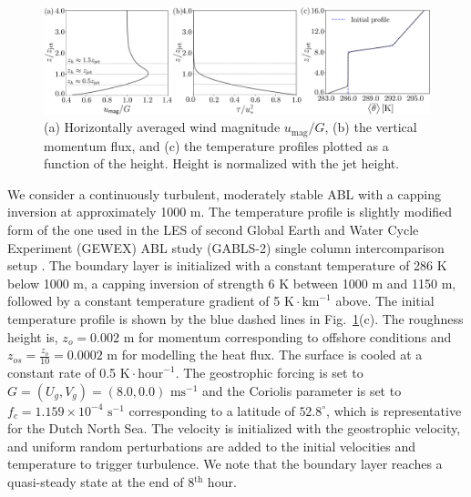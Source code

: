 \documentclass[%
 aip,
 amsmath,amssymb,
reprint,
twocolumn,%
author-numerical,%
]{revtex4-1}
\begin{document}
\begin{figure}
 \centering
 \includegraphics[width=\linewidth]{fig2}
 \caption{(a) Horizontally averaged wind magnitude $u_\text{mag}/G$, (b) the vertical momentum flux, and (c) the temperature profiles plotted as a function of the height. Height is normalized with the jet height.}
 \label{fig2}
\end{figure}
\vspace{-5mm}
{\color{black} We consider a continuously turbulent, moderately stable ABL with a capping inversion at approximately 1000 m. The temperature profile is slightly modified form of the one used in the LES of second Global Earth and Water Cycle Experiment (GEWEX) ABL study (GABLS-2) single column intercomparison setup \cite{kum10}. The boundary layer is initialized with a constant temperature of 286 $\text{K}$ below 1000 $\text{m}$, a capping inversion of strength 6 $\text{K}$ between 1000 m and 1150 m, followed by a constant temperature gradient of 5 $\text{K}\cdot\text{km}^{-1}$ above. The initial temperature profile is shown by the blue dashed lines in Fig.\ \ref{fig2}(c). The roughness height is, $z_o=0.002$ m for momentum corresponding to offshore conditions \cite{dor15} and $z_{os} = \frac{z_o}{10}= 0.0002$ m \cite{bru82} for modelling the heat flux. The surface is cooled at a constant rate of 0.5 $\text{K}\cdot\text{hour}^{-1}$. The geostrophic forcing is set to $G=(U_g,V_g)=(8.0,0.0)$ $\text{m}\text{s}^{-1}$ and the Coriolis parameter is set to $f_c=1.159\times10^{-4}$ $\text{s}^{-1}$ corresponding to a latitude of $52.8^\circ$, which is representative for the Dutch North Sea. The velocity is initialized with the geostrophic velocity, and uniform random perturbations are added to the initial velocities and temperature to trigger turbulence. We note that the boundary layer reaches a quasi-steady state at the end of 8$^\text{th}$ hour.}\\
\end{document}
